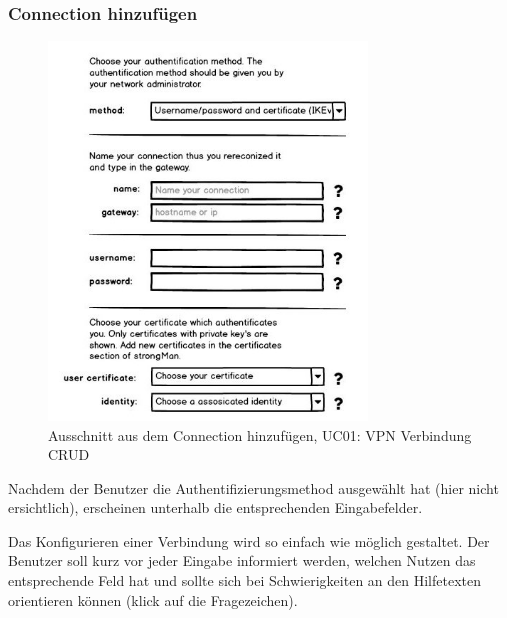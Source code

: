 \subsubsection{Connection hinzufügen}
\noindent\begin{minipage}[t]{0.55\textwidth}
\vspace{0pt}
    \begin{figure}[H]
    	\centering
    	\includegraphics[width=240pt]{images/mockups/short_con_config.jpg}
    	\caption{Ausschnitt aus dem Connection hinzufügen,  UC01: VPN Verbindung CRUD}
    \end{figure}
\end{minipage}
\hfill
\begin{minipage}[t]{0.45\textwidth}
\vspace{0pt}
Nachdem der Benutzer die Authentifizierungsmethod ausgewählt hat (hier nicht ersichtlich), erscheinen unterhalb die entsprechenden Eingabefelder.

Das Konfigurieren einer Verbindung wird so einfach wie möglich gestaltet. Der Benutzer soll kurz vor jeder Eingabe informiert werden, welchen Nutzen das entsprechende Feld hat und sollte sich bei Schwierigkeiten an den Hilfetexten orientieren können (klick auf die Fragezeichen).
\end{minipage}